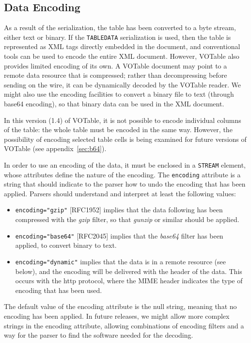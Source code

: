 \documentclass[11pt,a4paper]{ivoa}
\def\Arefx#1{appendix~\ref{#1}}
\let\fg=\color
\def\attr#1{{\tt{\fg{DarkRed}#1}}}
\def\elem#1{{\tt{\fg{DarkRed}#1}}}
\def\attrval#1#2{{\tt{\fg{DarkRed}#1}="{\fg{DarkPurple}#2}"}}
\begin{document}
{\subsection{Data Encoding}
\label{elem:STREAM}

As a result of the serialization, the table has been converted to
a byte stream, either text or binary. If the {\elem{TABLEDATA}}
serialization is used, then the table is represented as XML tags
directly  embedded in the document,
and conventional tools can be used to encode the entire XML document.
However, VOTable also provides limited encoding of its own.
A VOTable document may point to a remote data resource that is compressed;
rather than decompressing before sending on the wire, it can be dynamically
decoded by the VOTable reader. We might also use the encoding facilities to
convert a binary file to text (through base64 encoding), so that binary
data can be used in the XML document.

In this version (1.4) of VOTable, it is not possible to encode
individual columns of the table: the whole table must be encoded in
the same way. However, the possibility of encoding selected table cells
is  being examined for future versions of VOTable
(see \Arefx{sec:b64}).

In order to use an encoding of the data, it must be enclosed in a
{\elem{STREAM}}
element, whose attributes define the nature of the encoding. The
{\attr{encoding}}
attribute is a string that should indicate to the parser how to undo
the encoding that has been applied. Parsers should understand and
interpret at least the following values:
\begin{itemize}
        \item {\attrval{encoding}{gzip}} [RFC1952]
        implies that the data following has been compressed with the {\em gzip}
        filter, so that {\em gunzip} or similar should be applied.
        \item {\attrval{encoding}{base64}} [RFC2045]
        implies that the {\em base64} filter has been applied, to convert binary
        to text.
        \item {\attrval{encoding}{dynamic}}
        implies that the data is in a remote resource (see below), and the
        encoding will be delivered with the header of the data.
        This occurs with the http protocol, where the MIME header indicates
        the type of encoding that has been used.
\end{itemize}

\noindent The default value of the encoding attribute is the null string,
meaning that no encoding has been
applied. In future releases, we might allow more complex strings in
the encoding attribute, allowing combinations of encoding filters and
a way for the parser to find the software needed for the decoding.

}
\end{document}
